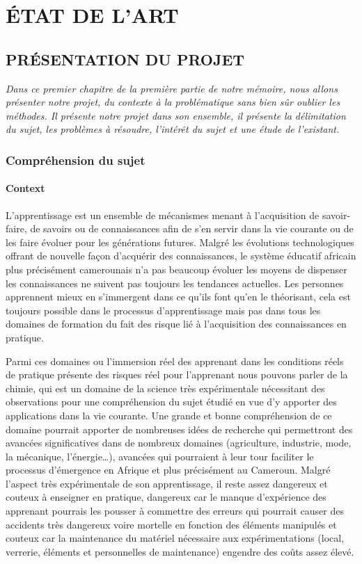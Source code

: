 \part{ÉTAT DE L’ART}
\chapter{PRÉSENTATION DU PROJET}

\textit{Dans ce premier chapitre de la première partie de notre mémoire, nous allons présenter
	notre projet, du contexte à la problématique sans bien sûr oublier les méthodes. Il présente
	notre projet dans son ensemble, il présente la délimitation du sujet, les problèmes à résoudre,
	l’intérêt du sujet et une étude de l’existant.}

\clearpage

\section{Compréhension du sujet}

\subsection{Context}

L’apprentissage est un ensemble de mécanismes menant à l'acquisition de savoir-faire, de savoirs ou de connaissances afin de s’en servir dans la vie courante ou de les faire évoluer pour les générations futures. Malgré les évolutions technologiques offrant de nouvelle façon d’acquérir des connaissances, le système éducatif africain plus précisément camerounais n’a pas beaucoup évoluer les moyens de dispenser les connaissances ne suivent pas toujours les tendances actuelles. Les personnes apprennent mieux en s’immergent dans ce qu’ils font qu’en le théorisant, cela est toujours possible dans le processus d’apprentissage mais pas dans tous les domaines de formation du fait des risque lié à l’acquisition des connaissances en pratique.

Parmi ces domaines ou l’immersion réel des apprenant dans les conditions réels de pratique présente des risques réel pour l’apprenant nous pouvons parler de la chimie, qui est un domaine de la science très expérimentale nécessitant des observations pour une compréhension du sujet étudié en vue d’y apporter des applications dans la vie courante. Une grande et bonne compréhension de ce domaine pourrait apporter de nombreuses idées de recherche qui permettront des avancées significatives dans de nombreux domaines (agriculture, industrie, mode, la mécanique, l'énergie…), avancées qui pourraient à leur tour faciliter le processus d'émergence en Afrique et plus précisément au Cameroun. Malgré l’aspect très expérimentale de son apprentissage, il reste assez dangereux et couteux à enseigner en pratique, dangereux car le manque d’expérience des apprenant pourrais les pousser à commettre des erreurs qui pourrait causer des accidents très dangereux voire mortelle en fonction des éléments manipulés et couteux car la maintenance du matériel nécessaire aux expérimentations (local, verrerie, éléments et personnelles de maintenance) engendre des coûts assez élevé.

